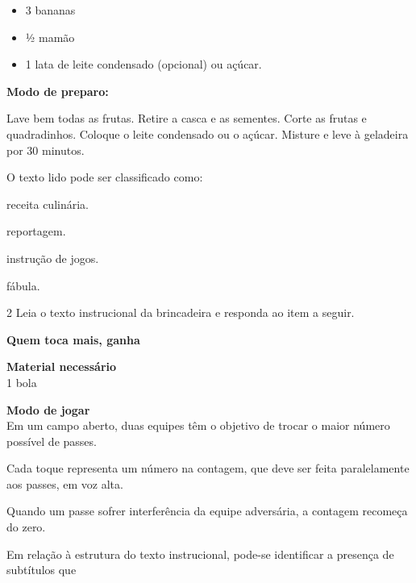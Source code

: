 \begin{conteudo}
\begin{conteudo}
\begin{conteudo}
\begin{conteudo}
{\begin{itemize}
\item 3 bananas

\item ½ mamão

\item 1 lata de leite condensado (opcional) ou açúcar.
\end{itemize}

\textbf{Modo de preparo:}

Lave bem todas as frutas. Retire a casca e as sementes. Corte as frutas
e quadradinhos. Coloque o leite condensado ou o açúcar. Misture e leve à
geladeira por 30 minutos.
}

O texto lido pode ser classificado como:

\begin{escolha}
\begin{multicols}{2}
\item
  receita culinária.
\item
  reportagem.
\item
  instrução de jogos.
\item
  fábula.
  \end{multicols}
\end{escolha}

\num{2} Leia o texto instrucional da brincadeira e responda ao item a seguir.


\begin{myquote}
\textbf{Quem toca mais, ganha}

\textbf{Material necessário}\\
1 bola

\textbf{Modo de jogar}\\
Em um campo aberto, duas equipes têm o
objetivo de trocar o maior número possível de passes.

Cada toque representa um número na contagem, que deve ser feita
paralelamente aos passes, em voz alta.

Quando um passe sofrer interferência da equipe adversária, a contagem
recomeça do zero.

\end{myquote}

Em relação à estrutura do texto instrucional, pode-se identificar a
presença de subtítulos que


\end{conteudo}
\end{conteudo}
\end{conteudo}
\end{conteudo}
